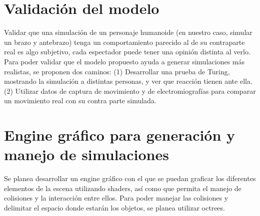 \section{Validación del modelo}

Validar que una simulación de un personaje humanoide (en nuestro caso, simular un brazo y antebrazo) tenga un comportamiento parecido al de su contraparte real es algo subjetivo, cada espectador puede tener una opinión distinta al verlo. Para poder validar que el modelo propuesto ayuda a generar simulaciones más realistas, se proponen dos caminos: (1) Desarrollar una prueba de Turing, mostrando la simulación a distintas personas, y ver que reacción tienen ante ella. (2) Utilizar datos de captura de movimiento y de electromiografías para comparar un movimiento real con su contra parte simulada. 

\section{Engine gráfico para generación y manejo de simulaciones}

Se planea desarrollar un engine gráfico con el que se puedan graficar los diferentes elementos de la escena utilizando shaders, así como que permita el manejo de colisiones y la interacción entre ellos. Para poder manejar las colisiones y delimitar el espacio donde estarán los objetos, se planea utilizar octrees.















